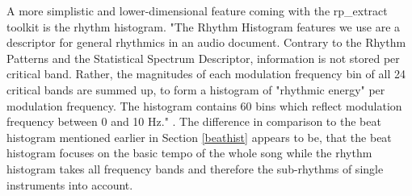 A more simplistic and lower-dimensional feature coming with the rp\_extract toolkit is the rhythm histogram. "The Rhythm Histogram features we use are a descriptor for general rhythmics in an audio document. Contrary to the Rhythm Patterns and the Statistical Spectrum Descriptor, information is not stored per critical band. Rather, the magnitudes of each modulation frequency bin of all 24 critical bands are summed up, to form a histogram of "rhythmic energy" per modulation frequency. The histogram contains 60 bins which reflect modulation frequency between 0 and 10 Hz." \cite[p. 3]{rp1}. 
The difference in comparison to the beat histogram mentioned earlier in Section \ref{beathist} appears to be, that the beat histogram focuses on the basic tempo of the whole song while the rhythm histogram takes all frequency bands and therefore the sub-rhythms of single instruments into account. 

